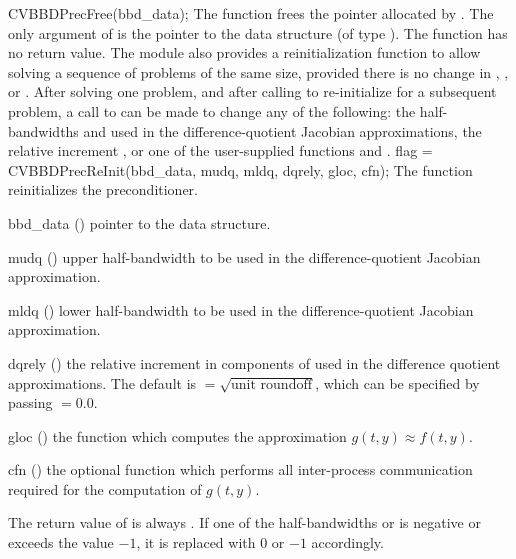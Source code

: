 {}
{
  CVBBDPrecFree(bbd\_data);
}
{
  The function  frees the pointer allocated by
  .
}
{
  The only argument of  is the pointer to the {\cvbbdpre} 
  data structure (of type ).
}
{
  The function  has no return value.
}
{}
The {\cvbbdpre} module also provides a reinitialization function to allow
solving  a sequence of problems of the same size,
provided there is no change in , , or .
After solving one problem, and after calling  to re-initialize 
{\cvode} for a subsequent problem, a call to  can be made
to change any of the following: the half-bandwidths  and  
used in the difference-quotient Jacobian approximations, the relative increment
, or one of the user-supplied functions  and .
{
  flag = CVBBDPrecReInit(bbd\_data, mudq, mldq, dqrely, gloc, cfn);
}
{
  The function  reinitializes the {\cvbbdpre} preconditioner.
}
{
  \begin{args}
  \item[bbd\_data] ()
    pointer to the {\cvbbdpre} data structure.
  \item[mudq] ()
    upper half-bandwidth to be used in the difference-quotient Jacobian approximation.
  \item[mldq] ()
    lower half-bandwidth to be used in the difference-quotient Jacobian approximation.
  \item[dqrely] ()
    the relative increment in components of  used in the difference quotient
    approximations.  The default is  $= \sqrt{\text{unit roundoff}}$,
    which can be specified by passing  $= 0.0$.
  \item[gloc] ()
    the {\C} function which computes the approximation $g(t,y) \approx f(t,y)$. 
  \item[cfn] ()
    the optional {\C} function which performs all inter-process communication required for
    the computation of $g(t,y)$.
  \end{args}
}
{
  The return value of  is always .
}
{
  If one of the half-bandwidths  or  is negative or
  exceeds the value $-1$, it is replaced with 0 or
  $-1$ accordingly.
}
